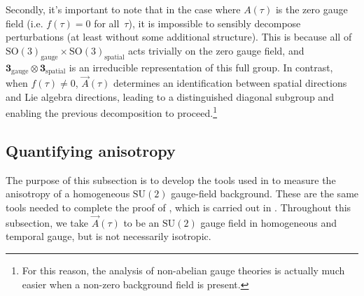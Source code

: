 Secondly, it's important to note that in the case where $A(\tau)$ is the zero gauge field (i.e. $f(\tau)=0$ for all~$\tau$), it is impossible to sensibly decompose perturbations (at least without some additional structure). This is because all of $\mathrm{SO}(3)_{\mathrm{gauge}}\times\mathrm{SO}(3)_{\mathrm{spatial}}$ acts trivially on the zero gauge field, and $\mathbf{3}_{\mathrm{gauge}}\otimes\mathbf{3}_{\mathrm{spatial}}$ is an irreducible representation of this full group. In contrast, when $f(\tau)\neq0$, $\vec{A}(\tau)$ determines an identification between spatial directions and Lie algebra directions, leading to a distinguished diagonal subgroup and enabling the previous decomposition to proceed.\footnote{For this reason, the analysis of non-abelian gauge theories is actually much easier when a non-zero background field is present. }

\subsection{\label{app:quant-aniso}Quantifying anisotropy}

The purpose of this subsection is to develop the tools used in  to measure the anisotropy of a homogeneous $\mathrm{SU}(2)$ gauge-field background. These are the same tools needed to complete the proof of , which is carried out in . Throughout this subsection, we take $\vec{A}(\tau)$ to be an $\mathrm{SU}(2)$ gauge field in homogeneous and temporal gauge, but is not necessarily isotropic.


